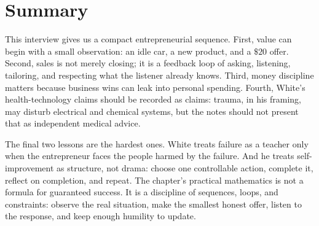 \section{Summary}

This interview gives us a compact entrepreneurial sequence. First, value can begin with a small observation: an idle car, a new product, and a \(\$20\) offer. Second, sales is not merely closing; it is a feedback loop of asking, listening, tailoring, and respecting what the listener already knows. Third, money discipline matters because business wins can leak into personal spending. Fourth, White's health-technology claims should be recorded as claims: trauma, in his framing, may disturb electrical and chemical systems, but the notes should not present that as independent medical advice.

The final two lessons are the hardest ones. White treats failure as a teacher only when the entrepreneur faces the people harmed by the failure. And he treats self-improvement as structure, not drama: choose one controllable action, complete it, reflect on completion, and repeat. The chapter's practical mathematics is not a formula for guaranteed success. It is a discipline of sequences, loops, and constraints: observe the real situation, make the smallest honest offer, listen to the response, and keep enough humility to update.